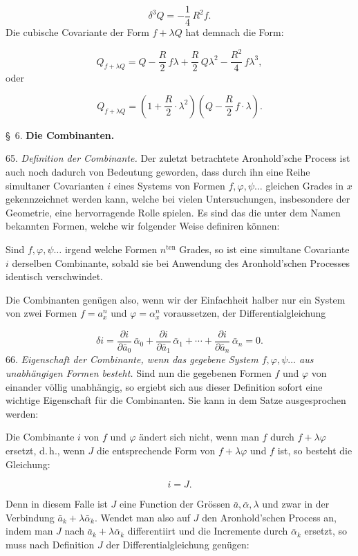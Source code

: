 \documentclass[11pt]{article}
\providecommand{\gesperrt}[1]{\textls[130]{#1}}
\providecommand{\weberpage}[1]{}
\providecommand{\weq}[2]{\begin{equation}\tag{#1}#2\end{equation}}
\begin{document}
\[
\delta^3 Q = -\frac{1}{4}\,R^2 f .
\]
Die cubische Covariante der Form $f + \lambda Q$ hat demnach die Form:

\weq{IV}{
Q_{f+\lambda Q} = Q - \frac{R}{2}\,f \lambda + \frac{R}{2}\,Q \lambda^2 - \frac{R^2}{4}\,f \lambda^3 ,
}
oder

\weq{V}{
Q_{f+\lambda Q} = \left(1 + \frac{R}{2}\cdot \lambda^2\right)\left(Q - \frac{R}{2}\,f \cdot \lambda\right) .
}

\begin{center}
\S\ 6. \textbf{Die Combinanten.}
\end{center}

65. \textit{Definition der Combinante.} Der zuletzt betrachtete Aronhold'sche Process ist auch noch dadurch von Bedeutung geworden, dass durch ihn eine Reihe simultaner Covarianten $i$ eines Systems von Formen $f, \varphi, \psi \ldots$ gleichen Grades in $x$ gekennzeichnet werden kann, welche bei vielen Untersuchungen, insbesondere der Geometrie, eine hervorragende Rolle spielen. Es sind das die unter dem Namen \gesperrt{Combinanten} bekannten Formen, welche wir folgender Weise definiren können:

\glqq{}Sind $f, \varphi, \psi \ldots$ irgend welche Formen $n^{\text{ten}}$ Grades, so ist eine simultane Covariante $i$ derselben Combinante, sobald sie bei Anwendung des Aronhold'schen Processes identisch verschwindet.\grqq{}

Die Combinanten genügen also, wenn wir der Einfachheit halber nur ein System von zwei Formen $f = a_x^n$ und $\varphi = \alpha_x^n$ voraussetzen, der Differentialgleichung

\weq{I}{
\delta i = \frac{\partial i}{\partial \bar a_0}\, \bar \alpha_0 + \frac{\partial i}{\partial \bar a_1}\, \bar \alpha_1 + \cdots + \frac{\partial i}{\partial \bar a_n}\, \bar \alpha_n = 0 .
}
66. \textit{Eigenschaft der Combinante, wenn das gegebene System $f, \varphi, \psi \ldots$ aus unabhängigen Formen besteht.} Sind nun die gegebenen Formen $f$ und $\varphi$ von einander völlig unabhängig, so ergiebt sich aus dieser Definition sofort eine wichtige Eigenschaft für die Combinanten. Sie kann in dem Satze ausgesprochen werden:

\glqq{}Die Combinante $i$ von $f$ und $\varphi$ ändert sich nicht, wenn man $f$ durch $f + \lambda \varphi$ ersetzt, d.\,h., wenn $J$ die entsprechende Form von $f + \lambda \varphi$ und $f$ ist, so besteht die Gleichung:

\[
i = J .
\]
\grqq{}


\weberpage{71}
Denn in diesem Falle ist $J$ eine Function der Grössen $\bar a, \bar \alpha, \lambda$ und zwar in der Verbindung $\bar a_k + \lambda \bar \alpha_k$. Wendet man also auf $J$ den Aronhold'schen Process an, indem man $J$ nach $\bar a_k + \lambda \bar \alpha_k$ differentiirt und die Incremente durch $\bar \alpha_k$ ersetzt, so muss nach Definition $J$ der Differentialgleichung genügen:
\end{document}
